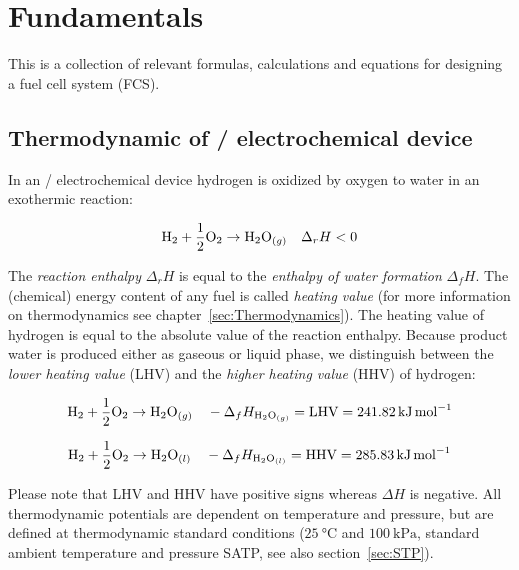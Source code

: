 \documentclass[11pt,a4paper,english,twoside]{scrreprt}
\begin{document}
\maketitle

\tableofcontents    %


\chapter{Fundamentals}

This is a collection of relevant formulas, calculations and equations for designing a fuel cell system (FCS).


\section{Thermodynamic of / electrochemical device}

In an / electrochemical device hydrogen is oxidized by oxygen to water in an exothermic reaction:

\[\ce{H2} + \frac 12 \ce{O2} \to \ce{H2O}_{(g)} \quad \Delta_r H < 0\]

The \textit{reaction enthalpy} $\Delta_r H$ is equal to the \textit{enthalpy of water formation} $\Delta_f H$. The (chemical) energy content of any fuel is called \textit{heating value} (for more information on thermodynamics see chapter~\ref{sec:Thermodynamics}). The heating value of hydrogen is equal to the absolute value of the reaction enthalpy. Because product water is produced either as gaseous or liquid phase, we distinguish between the \textit{lower heating value} (LHV) and the \textit{higher heating value} (HHV) of hydrogen:

\[\ce{H2} + \frac 12 \ce{O2} \to \ce{H2O}_{(g)} \quad -\Delta_f H_{\ce{H2O}_{(g)} } =\text{LHV}=\SI{241.82}{\kilo\joule\per\mole}\]

\[\ce{H2} + \frac 12 \ce{O2} \to \ce{H2O}_{(l)} \quad -\Delta_f H_{\ce{H2O}_{(l)} } =\text{HHV}=\SI{285.83}{\kilo\joule\per\mole}\]

Please note that LHV and HHV have positive signs whereas $\Delta H$ is negative. All thermodynamic potentials are dependent on temperature and pressure, but are defined at thermodynamic standard conditions ($\SI{25}{\degreeCelsius}$ and $\SI{100}{\kilo\pascal}$, standard ambient temperature and pressure SATP, see also section~\ref{sec:STP}).
\end{document}
